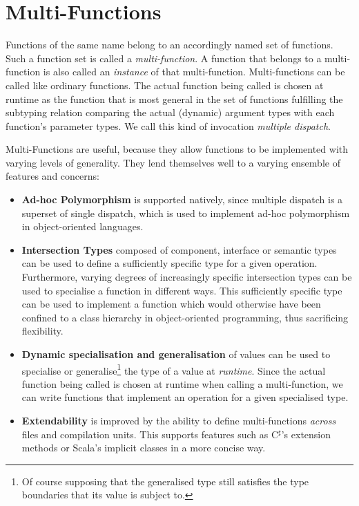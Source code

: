\chapter{Multi-Functions}

Functions of the same name belong to an accordingly named set of functions. Such a function set is called a \textit{multi-function}. A function that belongs to a multi-function is also called an \textit{instance} of that multi-function. Multi-functions can be called like ordinary functions. The actual function being called is chosen at runtime as the function that is most general in the set of functions fulfilling the subtyping relation comparing the actual (dynamic) argument types with each function's parameter types. We call this kind of invocation \textit{multiple dispatch}. 

Multi-Functions are useful, because they allow functions to be implemented with varying levels of generality. They lend themselves well to a varying ensemble of features and concerns:
\begin{itemize}
	\item \textbf{Ad-hoc Polymorphism} is supported natively, since multiple dispatch is a superset of single dispatch, which is used to implement ad-hoc polymorphism in object-oriented languages.
	\item \textbf{Intersection Types} composed of component, interface or semantic types can be used to define a sufficiently specific type for a given operation. Furthermore, varying degrees of increasingly specific intersection types can be used to specialise a function in different ways. This sufficiently specific type can be used to implement a function which would otherwise have been confined to a class hierarchy in object-oriented programming, thus sacrificing flexibility.
	\item \textbf{Dynamic specialisation and generalisation} of values can be used to specialise or generalise\footnote{Of course supposing that the generalised type still satisfies the type boundaries that its value is subject to.} the type of a value at \textit{runtime}. Since the actual function being called is chosen at runtime when calling a multi-function, we can write functions that implement an operation for a given specialised type.
	\item \textbf{Extendability} is improved by the ability to define multi-functions \textit{across} files and compilation units. This supports features such as C$^\sharp$'s extension methods or Scala's implicit classes in a more concise way.
\end{itemize}

